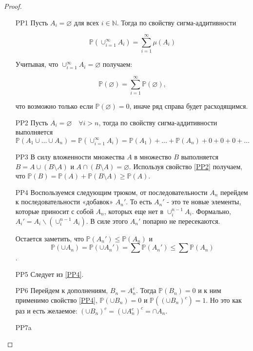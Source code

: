 \documentclass[pdftex, 12pt, a4paper]{article}
\def \mbb{\mathbb}
\def \N{\mbb N}
\def \PP{\mbb{P}}
\renewcommand{\ge}{\geqslant}
\renewcommand{\leq}{\leqslant}
\theoremstyle{definition} %
\numberwithin{problem}{section}
\numberwithin{blits}{section}
\begin{document}
\begin{proof}

\mbox{ }

\begin{enumerate}
\item[PP1] Пусть $A_i = \varnothing$ для всех $i \in \N$. Тогда по свойству сигма-аддитивности 

\[\PP(\cup_{i=1}^{\infty} A_i) = \sum_{i=1}^{\infty} \mu(A_i) \]

Учитывая, что $\cup_{i=1}^{\infty} A_i = \varnothing$ получаем:

\[ \PP(\varnothing) = \sum_{i=1}^{\infty} \PP(\varnothing) ,\]

что возможно только если $\PP(\varnothing) = 0$, иначе ряд справа будет расходящимся. 

\item[PP2]\label{PP2} Пусть $A_i = \varnothing \quad \forall i > n$, тогда по свойству сигма-аддитивности выполняется \[\PP(A_1 \cup \ldots \cup A_n) = \PP(\cup_{i=1}^{\infty} A_i) = \PP(A_1) + \ldots + \PP(A_n) + 0 + 0 + 0 + \ldots \]

\item[PP3] В силу вложенности множества $A$ в множество $B$ выполняется $B = A \cup (B \setminus A)$ и $A \cap (B \setminus A) = \varnothing$. Используя свойство \ref{PP2} получаем, что $\PP(B) = \PP(A) + \PP(B \setminus A) \ge \PP(A)$. 

\item[PP4]\label{PP4} Воспользуемся следующим трюком, от последовательности $A_{n}$ перейдем к последовательности «добавок» $A_{n}'$. То есть $A_{n}'$ - это те новые элементы, которые приносит с собой $A_{n}$, которых еще нет в $\cup_{i}^{n-1}A_{i}$. Формально, $A_{i}'=A_{i}\backslash(\cup_{i}^{n-1}A_{i})$. В силе этого $A_{n}'$ попарно не пересекаются.

Остается заметить, что $\PP(A_{n}')\leq \PP(A_{n})$ и \[\PP(\cup A_{n})=\PP(\cup A_{n}')=\sum \PP(A_{n}')\leq \sum \PP(A_{n})\].

\item[PP5] Следует из \ref{PP4}.

\item[PP6] Перейдем к дополнениям, $B_{n}=A_{n}^{c}$. Тогда $\PP(B_{n})=0$ и к ним применимо свойство \ref{PP4}, $\PP(\cup B_{n})=0$ и $\PP((\cup B_{n})^{c})=1$. Но это как раз и есть желаемое: $(\cup B_{n})^{c}=(\cup A_{n}^{c})^{c}=\cap A_{n}$.

\item[PP7a]\label{PP7a} 


\end{enumerate}
\end{proof}
\end{document}
